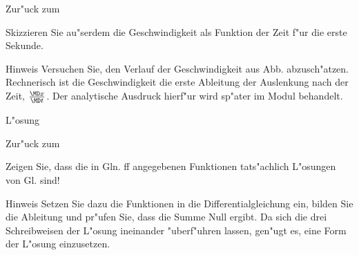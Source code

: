 \begin{MExercises}
\begin{MExercise}
Zur"uck zum 
\end{MExercise}

\begin{MExercise}
Skizzieren Sie au"serdem die Geschwindigkeit als Funktion der Zeit f"ur die erste Sekunde.

\begin{MHint}{Hinweis}
  Versuchen Sie, den Verlauf der Geschwindigkeit aus Abb.  abzusch"atzen. Rechnerisch ist die Geschwindigkeit die erste Ableitung der Auslenkung nach der Zeit, $\frac{\MD x }{\MD t}$. Der analytische Ausdruck hierf"ur wird sp"ater im Modul behandelt.
\end{MHint}

\begin{MHint}{L"osung}
\begin{center}
  \end{center}
\end{MHint}

Zur"uck zum 
\end{MExercise}

\begin{MExercise}
Zeigen Sie, dass die in Gln. ff angegebenen Funktionen tats"achlich L"osungen von Gl.  sind!

\begin{MHint}{Hinweis}
  Setzen Sie dazu die Funktionen in die Differentialgleichung ein, bilden Sie die Ableitung und pr"ufen Sie, dass die Summe Null ergibt. Da sich die drei Schreibweisen der L"osung ineinander "uberf"uhren lassen, gen"ugt es, eine Form der L"osung einzusetzen. 
\end{MHint}


\end{MExercise}
\end{MExercises}
